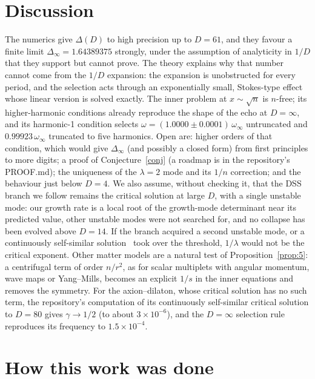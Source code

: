 \documentclass[aps,prd,onecolumn,superscriptaddress,nofootinbib,10pt]{revtex4-2}
\newcommand{\Dinf}{\Delta_\infty}
\begin{document}
\section{Discussion}

The numerics give $\Delta(D)$ to high precision up to $D = 61$, and they favour a finite limit
$\Dinf = 1.64389375$ strongly, under the assumption of analyticity in $1/D$ that they support but cannot prove. The
theory explains why that number cannot come from the $1/D$ expansion: the expansion is unobstructed for every period,
and the selection acts through an exponentially small, Stokes-type effect whose linear version is solved exactly. The
inner problem at $x \sim \sqrt n$ is $n$-free; its higher-harmonic conditions already reproduce the shape of the echo
at $D = \infty$, and its harmonic-1 condition selects $\omega = (1.0000 \pm 0.0001)\,\omega_\infty$ untruncated and
$0.99923\,\omega_\infty$ truncated to five harmonics. Open are: higher orders of that condition, which would give $\Dinf$ (and possibly a closed
form) from first principles to more digits; a proof of Conjecture~\ref{conj} (a roadmap is in the repository's PROOF.md); the uniqueness of the $\lambda = 2$ mode and its $1/n$ correction;
and the behaviour just below $D = 4$. We also assume, without checking it, that the DSS branch we follow remains the
critical solution at large $D$, with a single unstable mode: our growth rate is a local root of the growth-mode
determinant near its predicted value, other unstable modes were not searched for, and no collapse has been evolved
above $D = 14$. If the branch acquired a second unstable mode, or a continuously self-similar solution~\cite{ClarkPimentel2025}
took over the threshold, $1/\lambda$ would not be the critical exponent. Other matter models are a natural test of
Proposition~\ref{prop:5}: a centrifugal term of order $n/r^2$, as for scalar multiplets with angular momentum, wave maps or
Yang--Mills, becomes an explicit $1/s$ in the inner equations and removes the symmetry. For the axion--dilaton, whose
critical solution has no such term, the repository's computation of its continuously self-similar critical solution to
$D = 80$ gives $\gamma \to 1/2$ (to about $3\times10^{-6}$), and the $D = \infty$ selection rule reproduces its frequency to
$1.5\times10^{-4}$.

\section{How this work was done}
\label{sec:how}
\end{document}
